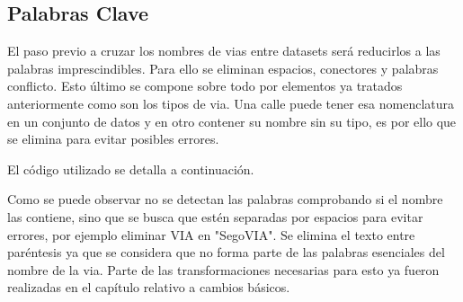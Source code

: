 




\clearpage
\subsection{Palabras Clave}

El paso previo a cruzar los nombres de vias entre datasets será reducirlos a las palabras imprescindibles. Para ello se eliminan espacios, conectores y palabras conflicto. Esto último se compone sobre todo por elementos ya tratados anteriormente como son los tipos de via. Una calle puede tener esa nomenclatura en un conjunto de datos y en otro contener su nombre sin su tipo, es por ello que se elimina para evitar posibles errores.

El código utilizado se detalla a continuación.









Como se puede observar no se detectan las palabras comprobando si el nombre las contiene, sino que se busca que estén separadas por espacios para evitar errores, por ejemplo eliminar VIA en "SegoVIA".
Se elimina el texto entre paréntesis ya que se considera que no forma parte de las palabras esenciales del nombre de la via.
Parte de las transformaciones necesarias para esto ya fueron realizadas en el capítulo relativo a cambios básicos.


